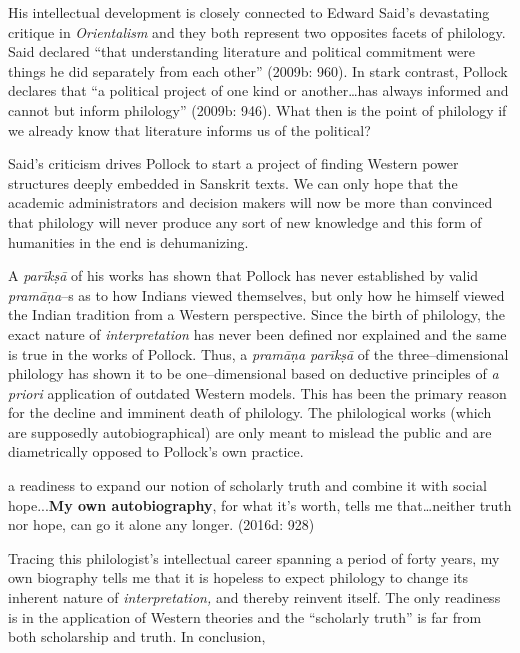 His intellectual development is closely connected to Edward Said’s devastating critique in \textit{Orientalism} and they both represent two opposites facets of philology. Said declared “that understanding literature and political commitment were things he did separately from each other” (2009b: 960). In stark contrast, Pollock declares that “a political project of one kind or another…has always informed and cannot but inform philology” (2009b: 946). What then is the point of philology if we already know that literature informs us of the political?

Said’s criticism drives Pollock to start a project of finding Western power structures deeply embedded in Sanskrit texts. We can only hope that the academic administrators and decision makers will now be more than convinced that philology will never produce any sort of new knowledge and this form of humanities in the end is dehumanizing.

A \textit{parīkṣā} of his works has shown that Pollock has never established by valid \textit{pramāṇa}–s as to how Indians viewed themselves, but only how he himself viewed the Indian tradition from a Western perspective. Since the birth of philology, the exact nature of \textit{interpretation} has never been defined nor explained and the same is true in the works of Pollock. Thus, a \textit{pramāṇa parīkṣā} of the three–dimensional philology has shown it to be one–dimensional based on deductive principles of \textit{a priori} application of outdated Western models. This has been the primary reason for the decline and imminent death of philology. The philological works (which are supposedly autobiographical) are only meant to mislead the public and are diametrically opposed to Pollock’s own practice.

\begin{myquote}
a readiness to expand our notion of scholarly truth and combine it with social hope...\textbf{My own autobiography}, for what it’s worth, tells me that…neither truth nor hope, can go it alone any longer. (2016d: 928)
\end{myquote}

Tracing this philologist’s intellectual career spanning a period of forty years, my own biography tells me that it is hopeless to expect philology to change its inherent nature of \textit{interpretation,} and thereby reinvent itself. The only readiness is in the application of Western theories and the “scholarly truth” is far from both scholarship and truth. In conclusion,

